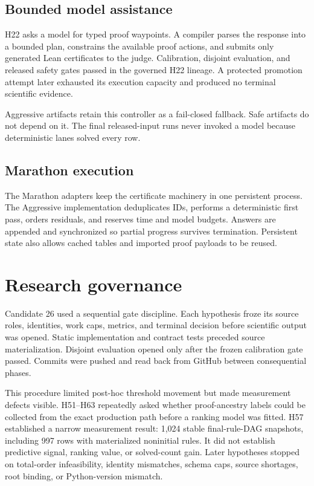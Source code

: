 \documentclass[10pt]{article}
\begin{document}
\subsection{Bounded model assistance}

H22 asks a model for typed proof waypoints. A compiler parses the response into a bounded plan, constrains the available proof actions, and submits only generated Lean certificates to the judge. Calibration, disjoint evaluation, and released safety gates passed in the governed H22 lineage. A protected promotion attempt later exhausted its execution capacity and produced no terminal scientific evidence.

Aggressive artifacts retain this controller as a fail-closed fallback. Safe artifacts do not depend on it. The final released-input runs never invoked a model because deterministic lanes solved every row.

\subsection{Marathon execution}

The Marathon adapters keep the certificate machinery in one persistent process. The Aggressive implementation deduplicates IDs, performs a deterministic first pass, orders residuals, and reserves time and model budgets. Answers are appended and synchronized so partial progress survives termination. Persistent state also allows cached tables and imported proof payloads to be reused.

\section{Research governance}

Candidate 26 used a sequential gate discipline. Each hypothesis froze its source roles, identities, work caps, metrics, and terminal decision before scientific output was opened. Static implementation and contract tests preceded source materialization. Disjoint evaluation opened only after the frozen calibration gate passed. Commits were pushed and read back from GitHub between consequential phases.

This procedure limited post-hoc threshold movement but made measurement defects visible. H51--H63 repeatedly asked whether proof-ancestry labels could be collected from the exact production path before a ranking model was fitted. H57 established a narrow measurement result: 1,024 stable final-rule-DAG snapshots, including 997 rows with materialized noninitial rules. It did not establish predictive signal, ranking value, or solved-count gain. Later hypotheses stopped on total-order infeasibility, identity mismatches, schema caps, source shortages, root binding, or Python-version mismatch.
\end{document}
